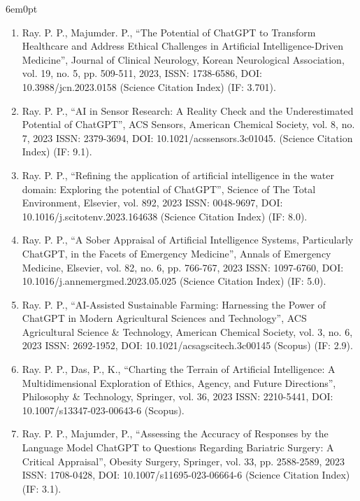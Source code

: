 \documentclass[11pt,a4paper]{moderncv}
\begin{document}
\begin{adjustwidth}{6em}{0pt}
\begin{enumerate}
		\item Ray. P. P., Majumder. P., “The Potential of ChatGPT to Transform Healthcare and Address Ethical Challenges in Artificial Intelligence-Driven Medicine”, Journal of Clinical Neurology, Korean Neurological Association, vol. 19, no. 5, pp. 509-511, 2023, ISSN: 1738-6586, DOI: 10.3988/jcn.2023.0158 (Science Citation Index) (IF: 3.701). 
		
		\item Ray. P. P., “AI in Sensor Research: A Reality Check and the Underestimated Potential of ChatGPT”, ACS Sensors, American Chemical Society, vol. 8, no. 7, 2023 ISSN: 2379-3694, DOI: 10.1021/acssensors.3c01045. (Science Citation Index) (IF: 9.1). 
		
		\item Ray. P. P., “Refining the application of artificial intelligence in the water domain: Exploring the potential of ChatGPT”, Science of The Total Environment, Elsevier, vol. 892, 2023 ISSN: 0048-9697, DOI: 10.1016/j.scitotenv.2023.164638 (Science Citation Index) (IF: 8.0). 
		
		\item Ray. P. P., “A Sober Appraisal of Artificial Intelligence Systems, Particularly ChatGPT, in the Facets of Emergency Medicine”, Annals of Emergency Medicine, Elsevier, vol. 82, no. 6, pp. 766-767, 2023 ISSN: 1097-6760, DOI: 10.1016/j.annemergmed.2023.05.025 (Science Citation Index) (IF: 5.0). 
		
		\item Ray. P. P., “AI-Assisted Sustainable Farming: Harnessing the Power of ChatGPT in Modern Agricultural Sciences and Technology”, ACS Agricultural Science \& Technology, American Chemical Society, vol. 3, no. 6, 2023 ISSN: 2692-1952, DOI: 10.1021/acsagscitech.3c00145 (Scopus) (IF: 2.9). 
		
		\item Ray. P. P., Das, P., K., “Charting the Terrain of Artificial Intelligence: A Multidimensional Exploration of Ethics, Agency, and Future Directions”, Philosophy \& Technology, Springer, vol. 36, 2023 ISSN: 2210-5441, DOI: 10.1007/s13347-023-00643-6 (Scopus). 
		
		\item Ray. P. P., Majumder, P., “Assessing the Accuracy of Responses by the Language Model ChatGPT to Questions Regarding Bariatric Surgery: A Critical Appraisal”, Obesity Surgery, Springer, vol. 33, pp. 2588-2589, 2023 ISSN: 1708-0428, DOI: 10.1007/s11695-023-06664-6 (Science Citation Index) (IF: 3.1). 
		

\end{enumerate}
\end{adjustwidth}
\end{document}
